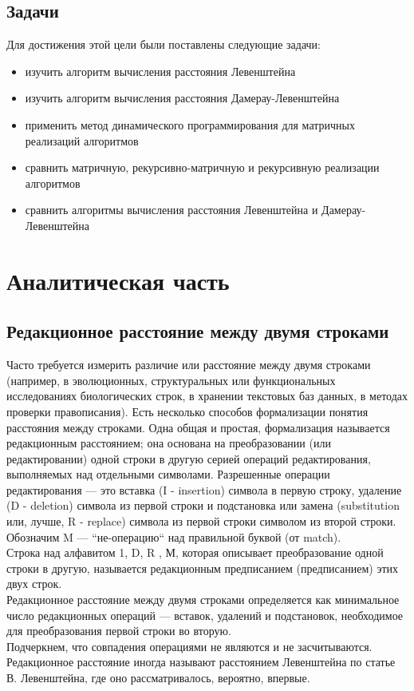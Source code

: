 \documentclass[a4paper,12pt]{article}
\begin{document}
\subsection*{Задачи}
Для достижения этой цели были поставлены следующие задачи:\\
\begin{itemize}
\item изучить алгоритм вычисления расстояния Левенштейна
\item изучить алгоритм вычисления расстояния Дамерау-Левенштейна
\item применить метод динамического программирования для матричных реализаций алгоритмов
\item сравнить матричную, рекурсивно-матричную и рекурсивную реализации алгоритмов
\item сравнить алгоритмы вычисления расстояния Левенштейна и Дамерау-Левенштейна
\end{itemize}
\newpage

\section{Аналитическая часть}
\subsection{Редакционное расстояние между двумя строками}
Часто требуется измерить различие или расстояние между двумя строками (например, в эволюционных, структуральных или функциональных исследованиях биологических строк, в хранении текстовых баз данных, в методах проверки правописания). Есть несколько способов формализации понятия расстояния между строками. Одна общая и простая, формализация называется редакционным расстоянием; она основана на преобразовании (или редактировании) одной строки в другую серией операций редактирования, выполняемых над отдельными символами. Разрешенные операции редактирования — это вставка (I - insertion) символа в первую строку, удаление (D - deletion) символа из первой строки и подстановка или замена (substitution или, лучше, R - replace) символа из первой строки символом из второй строки. Обозначим M — “не-операцию“ над правильной буквой (от match).\\
Строка над алфавитом 1, D, R , М, которая описывает преобразование одной строки в другую, называется редакционным предписанием (предписанием) этих двух строк.\\
Редакционное расстояние между двумя строками определяется как минимальное число редакционных операций — вставок, удалений и подстановок, необходимое для преобразования первой строки во вторую.\\
Подчеркнем, что совпадения операциями не являются и не засчитываются.
Редакционное расстояние иногда называют расстоянием Левенштейна по статье В. Левенштейна, где оно рассматривалось, вероятно, впервые.
\end{document}
